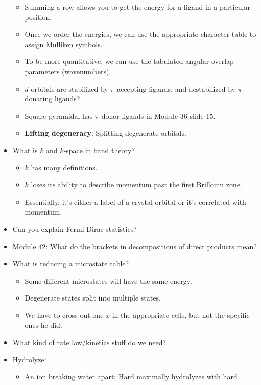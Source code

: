 \documentclass[../notes.tex]{subfiles}
\begin{document}
\begin{itemize}
\begin{itemize}
        \item Summing a row allows you to get the energy for a ligand in a particular position.
        \item Once we order the energies, we can use the appropriate character table to assign Mulliken symbols.
        \item To be more quantitative, we can use the tabulated angular overlap parameters (wavenumbers).
        \item $d$ orbitals are stabilized by $\pi$-accepting ligands, and destabilized by $\pi$-donating ligands?
        \item Square pyramidal has $\pi$-donor ligands in Module 36 slide 15.
        \item \textbf{Lifting degeneracy}: Splitting degenerate orbitals.
    \end{itemize}
    \item What is $k$ and $k$-space in band theory?
    \begin{itemize}
        \item $k$ has many definitions.
        \item $k$ loses its ability to describe momentum past the first Brillouin zone.
        \item Essentially, it's either a label of a crystal orbital or it's correlated with momentum.
    \end{itemize}
    \item Can you explain Fermi-Dirac statistics?
    \item Module 42: What do the brackets in decompositions of direct products mean?
    \item What is reducing a microstate table?
    \begin{itemize}
        \item Some different microstates will have the same energy.
        \item Degenerate states split into multiple states.
        \item We have to cross out one $x$ in the appropriate cells, but not the specific ones he did.
    \end{itemize}
    \item What kind of rate law/kinetics stuff do we need?
    \item Hydrolyze:
    \begin{itemize}
        \item An ion breaking water apart; Hard  maximally hydrolyzes with hard .
    \end{itemize}

\end{itemize}
\end{document}

